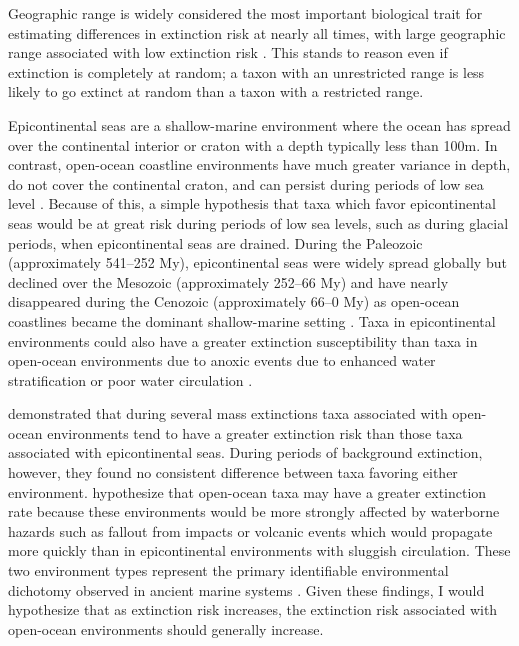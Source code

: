 \documentclass{article}
\begin{document}
Geographic range is widely considered the most important biological trait for estimating differences in extinction risk at nearly all times, with large geographic range associated with low extinction risk \citep{Jablonski1986,Jablonski1987,Jablonski2003,Payne2007,Jablonski2008a,Harnik2013,Finnegan2012a}. This stands to reason even if extinction is completely at random; a taxon with an unrestricted range is less likely to go extinct at random than a taxon with a restricted range.

Epicontinental seas are a shallow-marine environment where the ocean has spread over the continental interior or craton with a depth typically less than 100m. In contrast, open-ocean coastline environments have much greater variance in depth, do not cover the continental craton, and can persist during periods of low sea level \citep{Miller2009a}. Because of this, a simple hypothesis that taxa which favor epicontinental seas would be at great risk during periods of low sea levels, such as during glacial periods, when epicontinental seas are drained. During the Paleozoic (approximately 541--252 My), epicontinental seas were widely spread globally but declined over the Mesozoic (approximately 252--66 My) and have nearly disappeared during the Cenozoic (approximately 66--0 My) as open-ocean coastlines became the dominant shallow-marine setting \citep{Sheehan2001b,Peters2008,Miller2009a,Johnson1974}. Taxa in epicontinental environments could also have a greater extinction susceptibility than taxa in open-ocean environments due to anoxic events due to enhanced water stratification or poor water circulation \citep{Peters2007}.

\citet{Miller2009a} demonstrated that during several mass extinctions taxa associated with open-ocean environments tend to have a greater extinction risk than those taxa associated with epicontinental seas. During periods of background extinction, however, they found no consistent difference between taxa favoring either environment. \citet{Miller2009a} hypothesize that open-ocean taxa may have a greater extinction rate because these environments would be more strongly affected by waterborne hazards such as fallout from impacts or volcanic events which would propagate more quickly than in epicontinental environments with sluggish circulation. These two environment types represent the primary identifiable environmental dichotomy observed in ancient marine systems \citep{Miller2009a,Sheehan2001b}. Given these findings, I would hypothesize that as extinction risk increases, the extinction risk associated with open-ocean environments should generally increase. 
\end{document}
